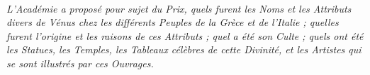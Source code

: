 \documentclass[a4paper, 18pt, oneside]{article}
\begin{document}
\setlength{\parskip}{1mm plus1mm minus1mm}
\clearpage
\Large
\color{white}
\paragraph{}
\emph{L'Académie a proposé pour sujet du Prix, quels furent les Noms et les Attributs divers de Vénus chez les différents Peuples de la Grèce et de l'Italie ; quelles furent l'origine et les raisons de ces Attributs ; quel a été son Culte ; quels ont été les Statues, les Temples, les Tableaux célèbres de cette Divinité, et les Artistes qui se sont illustrés par ces Ouvrages.}
\end{document}
